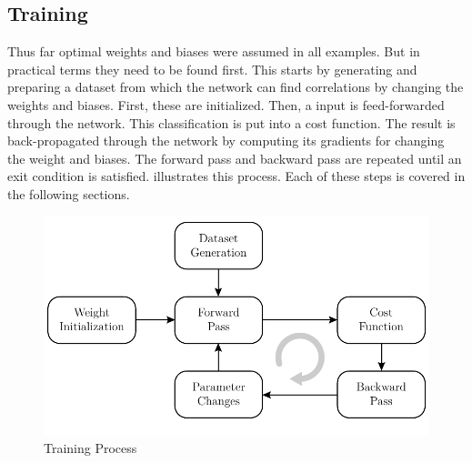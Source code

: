 \subsection{Training}
\label{sec:neural-networks-training}
Thus far optimal weights and biases were assumed in all examples.
But in practical terms they need to be found first.
This starts by generating and preparing a dataset from which the network can find correlations by changing the weights and biases.
First, these are initialized.
Then, a input is feed-forwarded through the network.
This classification is put into a cost function.
The result is back-propagated through the network by computing its gradients for changing the weight and biases.
The forward pass and backward pass are repeated until an exit condition is satisfied.
 illustrates this process.
Each of these steps is covered in the following sections.
\begin{figure}
	\centering
	\includegraphics{images/training.pdf}
	\caption[Training Process]{Training Process}
	\label{fig:training}
\end{figure}





